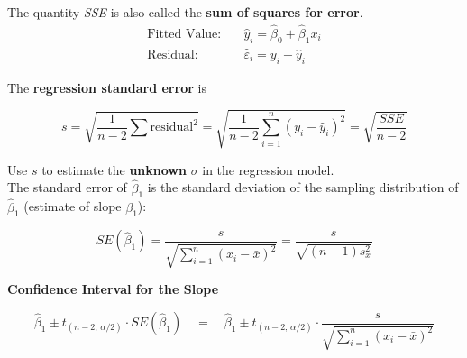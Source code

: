 The quantity \textit{SSE} is also called the \textbf{sum of squares for error}.
\begin{align*}
\text{Fitted Value:} \quad & \hat{y}_i = \hat{\beta}_0 + \hat{\beta}_1 x_i \\
\text{Residual:} \quad & \hat{\varepsilon}_i = y_i - \hat{y}_i
\end{align*}

The \textbf{regression standard error} is

\[
s = \sqrt{\frac{1}{n - 2} \sum \text{residual}^2} 
= \sqrt{\frac{1}{n - 2} \sum_{i=1}^{n} (y_i - \hat{y}_i)^2} 
= \sqrt{\frac{SSE}{n - 2}}
\]

Use $s$ to estimate the \textbf{unknown} $\sigma$ in the regression model.\\

The standard error of $\hat{\beta}_1$ is the standard deviation of the sampling distribution of $\hat{\beta}_1$ (estimate of slope $\beta_1$):

\[
SE(\hat{\beta}_1) = \frac{s}{\sqrt{\sum_{i=1}^{n} (x_i - \bar{x})^2}} 
= \frac{s}{\sqrt{(n - 1) s_x^2}}
\]

\vspace{1em}

\textbf{Confidence Interval for the Slope}

\[
\hat{\beta}_1 \pm t_{(n-2, \, \alpha/2)} \cdot SE(\hat{\beta}_1)
\quad = \quad 
\hat{\beta}_1 \pm t_{(n-2, \, \alpha/2)} \cdot \frac{s}{\sqrt{\sum_{i=1}^{n} (x_i - \bar{x})^2}}
\]


